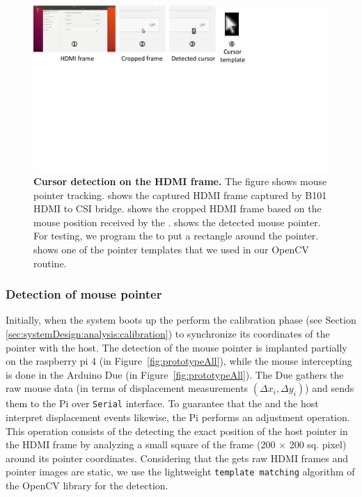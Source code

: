 \begin{figure}[t]
\centering
\includegraphics[trim={0 12cm 10cm 0}, clip, width=\linewidth]{chapters/ProtectIOn/images/cursorDetect.pdf}
\caption[Cursor detection on the HDMI frame]{\textbf{Cursor detection on the HDMI frame.} The figure shows \name mouse pointer tracking. \one shows the captured HDMI frame captured by B101 HDMI to CSI bridge. \two shows the cropped HDMI frame based on the mouse position received by the \device. \three shows the detected mouse pointer. For testing, we program the \device to put a rectangle around the pointer. \four shows one of the pointer templates that we used in our OpenCV routine.}
\label{fig:cursorDetect}
\centering
\end{figure} 



\subsubsection{Detection of mouse pointer}
\label{sec:prototype:impl:mouse}
%
Initially, when the system boots up the \device perform the calibration phase (see Section \ref{sec:systemDesign:analysis:calibration}) to synchronize its coordinates of the pointer with the host. The detection of the mouse pointer is implanted partially on the raspberry pi 4 (\six in Figure~\ref{fig:prototypeAll}), while the mouse intercepting is done in the Arduino Due (\three in Figure~\ref{fig:prototypeAll}). The Due gathers the raw mouse data (in terms of displacement measurements $(\Delta x_i, \Delta y_i)$) and sends them to the Pi over \texttt{Serial} interface.  To guarantee that the \device and the host interpret displacement events likewise, the Pi performs an adjustment operation. This operation consists of the \device detecting the exact position of the host pointer in the HDMI frame by analyzing a small square of the frame (200 $\times$ 200 sq. pixel) around its pointer coordinates. Considering that the \device gets raw HDMI frames and pointer images are static, we use the lightweight \texttt{template matching} algorithm of the OpenCV library for the detection.

